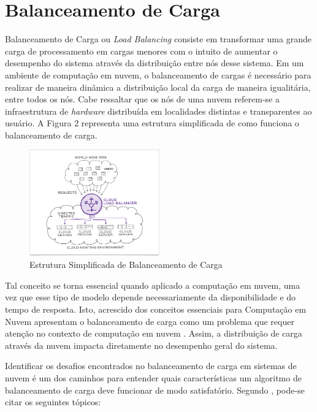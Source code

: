 \section{Balanceamento de Carga}\label{sec:balanceamento-carga}

Balanceamento de Carga ou \textit{Load Balancing} consiste em transformar uma grande carga de processamento em cargas menores com o intuito de aumentar o desempenho do sistema através da distribuição entre nós desse sistema. Em um ambiente de computação em nuvem, o balanceamento de cargas é necessário para realizar de maneira dinâmica a distribuição local da carga de maneira igualitária, entre todos os nós\cite{kaur2012load}. Cabe ressaltar que os nós de uma nuvem referem-se a infraestrutura de \textit{hardware} distribuída em localidades distintas e transparentes ao usuário. A Figura 2 representa uma estrutura simplificada de como funciona o balanceamento de carga. 

\begin{figure}[htb]
	\caption{\label{fig:bal}Estrutura Simplificada de Balanceamento de Carga}
	\begin{center}
		\includegraphics[width=0.50\textwidth]{img/cloud_balancer.png}
	\end{center}
\end{figure} 

Tal conceito se torna essencial quando aplicado a computação em nuvem, uma vez que esse tipo de modelo depende necessariamente da disponibilidade e do tempo de resposta. Isto, acrescido dos conceitos essenciais para Computação em Nuvem apresentam o balanceamento de carga como um problema que requer atenção no contexto de computação em nuvem \cite{sran2013comparative}. Assim, a distribuição de carga através da nuvem impacta diretamente no desempenho geral do sistema. 

Identificar os desafios encontrados no balanceamento de carga em sistemas de nuvem é um dos caminhos para entender quais características um algoritmo de balanceamento de carga deve funcionar de modo satisfatório. Segundo , pode-se citar os seguintes tópicos: 

